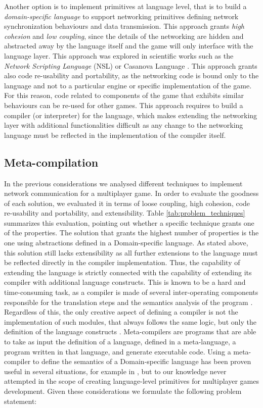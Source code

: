 Another option is to implement primitives at language level, that is to build a \textit{domain-specific language} to support networking primitives defining network synchronization behaviours and data transmission. This approach grants \textit{high cohesion} and \textit{low coupling}, since the details of the networking are hidden and abstracted away by the language itself and the game will only interface with the language layer. This approach was explored in scientific works such as the \textit{Network Scripting Language} (NSL) \cite{russell2008tackling} or Casanova Language \cite{DiGiacomo201725}. This approach grants also code re-usability and portability, as the networking code is bound only to the language and not to a particular engine or specific implementation of the game. For this reason, code related to components of the game that exhibits similar behaviours can be re-used for other games. This approach requires to build a compiler (or interpreter) for the language, which makes extending the networking layer with additional functionalities difficult as any change to the networking language must be reflected in the implementation of the compiler itself.

\subsection{Meta-compilation}

In the previous considerations we analysed different techniques to implement network communication for a multiplayer game. In order to evaluate the goodness of each solution, we evaluated it in terms of loose coupling, high cohesion, code re-usability and portability, and extensibility. Table \ref{tab:problem_techniques} summarizes this evaluation, pointing out whether a specific technique grants one of the properties. The solution that grants the highest number of properties is the one using abstractions defined in a Domain-specific language. As stated above, this solution still lacks extensibility as all further extensions to the language must be reflected directly in the compiler implementation. Thus, the capability of extending the language is strictly connected with the capability of extending its compiler with additional language constructs. This is known to be a hard and time-consuming task, as a compiler is made of several inter-operating components responsible for the translation steps and the semantics analysis of the program \cite{aho1986compilers,kaagedal1998generating}. Regardless of this, the only creative aspect of defining a compiler is not the implementation of such modules, that always follows the same logic, but only the definition of the language constructs \cite{BookShorre}. Meta-compilers are programs that are able to take as input the definition of a language, defined in a meta-language, a program written in that language, and generate executable code. Using a meta-compiler to define the semantics of a Domain-specific language has been proven useful in several situations, for example in \cite{kaagedal1998generating,DiGiacomo2017}, but to our knowledge never attempted in the scope of creating language-level primitives for multiplayer games development. Given these considerations we formulate the following problem statement:

